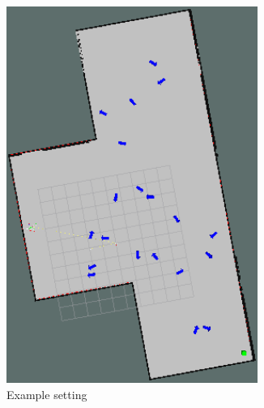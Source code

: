 \documentclass{article}  %
\begin{document}
	\begin{figure}[tbh]
      \begin{subfigure}[b]{0.435\columnwidth}

    \includegraphics[width=0.9\textwidth]{images/people.png}
    \caption{Example setting }
    \label{fig:exp_setting}
  \end{subfigure}
  \hspace{10mm}
  \begin{subfigure}[b]{0.435\columnwidth}

\end{subfigure}
\end{figure}
\end{document}
